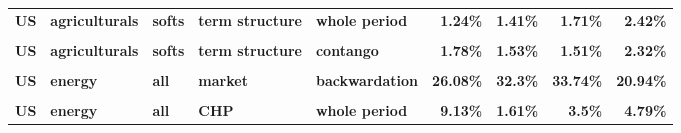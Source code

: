 \documentclass[
  authoryear,
  preprint,
  3p]{elsarticle}
\begin{document}
\begin{landscape}
\begin{longtable}[t]{>{}l>{}l>{}l>{}l>{}l>{}r>{}r>{}r>{}r}
\textbf{US} & \textbf{agriculturals} & \textbf{softs} & \textbf{term structure} & \textbf{whole period} & \textcolor[HTML]{4285f4}{\textbf{1.24\%}} & \textcolor[HTML]{4285f4}{\textbf{1.41\%}} & \textcolor[HTML]{4285f4}{\textbf{1.71\%}} & \textcolor[HTML]{4285f4}{\textbf{2.42\%}}\\
\addlinespace
\textbf{\cellcolor{gray!10}{US}} & \textbf{\cellcolor{gray!10}{agriculturals}} & \textbf{\cellcolor{gray!10}{softs}} & \textbf{\cellcolor{gray!10}{term structure}} & \textbf{\cellcolor{gray!10}{backwardation}} & \textcolor[HTML]{4285f4}{\textbf{\cellcolor{gray!10}{1.25\%}}} & \textcolor[HTML]{4285f4}{\textbf{\cellcolor{gray!10}{1.44\%}}} & \textcolor[HTML]{4285f4}{\textbf{\cellcolor{gray!10}{2.25\%}}} & \textcolor[HTML]{4285f4}{\textbf{\cellcolor{gray!10}{3.08\%}}}\\
\textbf{US} & \textbf{agriculturals} & \textbf{softs} & \textbf{term structure} & \textbf{contango} & \textcolor[HTML]{4285f4}{\textbf{1.78\%}} & \textcolor[HTML]{4285f4}{\textbf{1.53\%}} & \textcolor[HTML]{4285f4}{\textbf{1.51\%}} & \textcolor[HTML]{4285f4}{\textbf{2.32\%}}\\
\textbf{\cellcolor{gray!10}{US}} & \textbf{\cellcolor{gray!10}{energy}} & \textbf{\cellcolor{gray!10}{all}} & \textbf{\cellcolor{gray!10}{market}} & \textbf{\cellcolor{gray!10}{whole period}} & \textcolor[HTML]{4285f4}{\textbf{\cellcolor{gray!10}{26.58\%}}} & \textcolor[HTML]{4285f4}{\textbf{\cellcolor{gray!10}{31.57\%}}} & \textcolor[HTML]{4285f4}{\textbf{\cellcolor{gray!10}{38.94\%}}} & \textcolor[HTML]{4285f4}{\textbf{\cellcolor{gray!10}{25.9\%}}}\\
\textbf{US} & \textbf{energy} & \textbf{all} & \textbf{market} & \textbf{backwardation} & \textcolor[HTML]{4285f4}{\textbf{26.08\%}} & \textcolor[HTML]{4285f4}{\textbf{32.3\%}} & \textcolor[HTML]{4285f4}{\textbf{33.74\%}} & \textcolor[HTML]{4285f4}{\textbf{20.94\%}}\\
\textbf{\cellcolor{gray!10}{US}} & \textbf{\cellcolor{gray!10}{energy}} & \textbf{\cellcolor{gray!10}{all}} & \textbf{\cellcolor{gray!10}{market}} & \textbf{\cellcolor{gray!10}{contango}} & \textcolor[HTML]{4285f4}{\textbf{\cellcolor{gray!10}{26.84\%}}} & \textcolor[HTML]{4285f4}{\textbf{\cellcolor{gray!10}{31.47\%}}} & \textcolor[HTML]{4285f4}{\textbf{\cellcolor{gray!10}{42.16\%}}} & \textcolor[HTML]{4285f4}{\textbf{\cellcolor{gray!10}{28.77\%}}}\\
\addlinespace
\textbf{US} & \textbf{energy} & \textbf{all} & \textbf{CHP} & \textbf{whole period} & \textcolor[HTML]{4285f4}{\textbf{9.13\%}} & \textcolor[HTML]{4285f4}{\textbf{1.61\%}} & \textcolor[HTML]{4285f4}{\textbf{3.5\%}} & \textcolor[HTML]{4285f4}{\textbf{4.79\%}}\\

\end{longtable}
\end{landscape}
\end{document}
